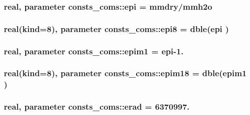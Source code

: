 \subsubsection[{\texorpdfstring{epi}{epi}}]{\setlength{\rightskip}{0pt plus 5cm}real, parameter consts\+\_\+coms\+::epi = {\bf mmdry}/{\bf mmh2o}}\hypertarget{namespaceconsts__coms_a907f95778dc27a8537377dbefeb43c0b}{}\label{namespaceconsts__coms_a907f95778dc27a8537377dbefeb43c0b}
\subsubsection[{\texorpdfstring{epi8}{epi8}}]{\setlength{\rightskip}{0pt plus 5cm}real(kind=8), parameter consts\+\_\+coms\+::epi8 = dble({\bf epi} )}\hypertarget{namespaceconsts__coms_ac4526dc6415ddf34fb8185c076fd5521}{}\label{namespaceconsts__coms_ac4526dc6415ddf34fb8185c076fd5521}
\subsubsection[{\texorpdfstring{epim1}{epim1}}]{\setlength{\rightskip}{0pt plus 5cm}real, parameter consts\+\_\+coms\+::epim1 = {\bf epi}-\/1.}\hypertarget{namespaceconsts__coms_a6f3042daf66dcb46bfb170331add64bb}{}\label{namespaceconsts__coms_a6f3042daf66dcb46bfb170331add64bb}
\subsubsection[{\texorpdfstring{epim18}{epim18}}]{\setlength{\rightskip}{0pt plus 5cm}real(kind=8), parameter consts\+\_\+coms\+::epim18 = dble({\bf epim1} )}\hypertarget{namespaceconsts__coms_a32f01e2fc04a575b499b3003989de443}{}\label{namespaceconsts__coms_a32f01e2fc04a575b499b3003989de443}
\subsubsection[{\texorpdfstring{erad}{erad}}]{\setlength{\rightskip}{0pt plus 5cm}real, parameter consts\+\_\+coms\+::erad = 6370997.}\hypertarget{namespaceconsts__coms_a359b412a0b4b216f6f33e18264e25f1d}{}\label{namespaceconsts__coms_a359b412a0b4b216f6f33e18264e25f1d}
